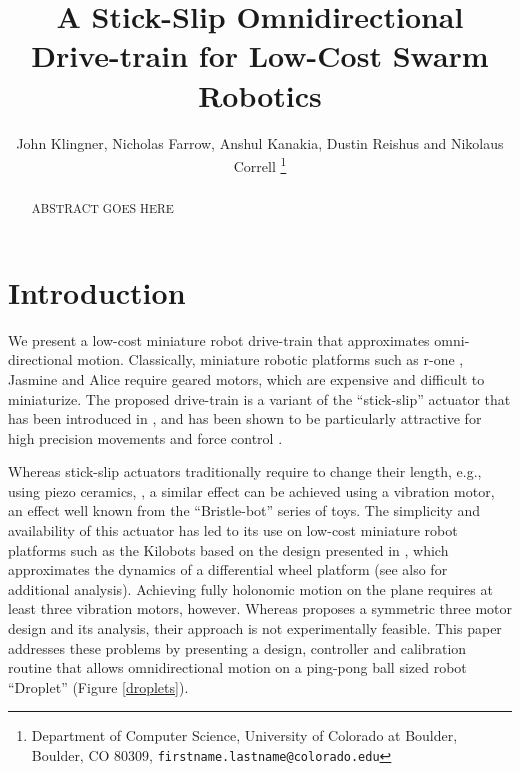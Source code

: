 \documentclass[letterpaper, 10pt, conference]{ieeeconf}
\title{\LARGE \bf
A Stick-Slip Omnidirectional Drive-train for Low-Cost Swarm Robotics
}
\author{John Klingner, Nicholas Farrow, Anshul Kanakia, Dustin Reishus and Nikolaus Correll%
\thanks{Department of Computer Science,
University of Colorado at Boulder,
 Boulder, CO 80309,
{\tt\small firstname.lastname{@}colorado.edu}}%
}
\begin{document}
\maketitle


\begin{abstract}
ABSTRACT GOES HERE
\end{abstract}



\section{Introduction}
We present a low-cost miniature robot drive-train that approximates omni-directional motion. Classically, miniature robotic platforms such as r-one \cite{mclurkin2013low}, Jasmine \cite{jasmine} and Alice \cite{alice} require geared motors, which are expensive and difficult to miniaturize. The proposed drive-train is a variant of the ``stick-slip'' actuator that has been introduced in \cite{breguet1998stick}, and has been shown to be particularly attractive for high precision movements \cite{brufau2005micron,chu2006novel,martel2001three,martel2005fundamental,eigoli2012locomotion} and force control \cite{vartholomeos2008analysis}.   

Whereas stick-slip actuators traditionally require to change their length, e.g., using piezo ceramics,  \cite{breguet1998stick, martel2005fundamental}, a similar effect can be achieved using a vibration motor, an effect well known from the ``Bristle-bot'' series of toys. The simplicity and availability of this actuator  has led to its use on low-cost miniature robot platforms such as the Kilobots \cite{rubenstein2012kilobot} based on the design presented in \cite{Vartholomeos2006}, which approximates the dynamics of a differential wheel platform (see also \cite{spartali2013speed} for additional analysis). Achieving fully holonomic motion on the plane requires at least three vibration motors, however. Whereas \cite{Vartholomeos2005} proposes a symmetric three motor design and its analysis, their approach is not experimentally feasible. This paper addresses these problems by presenting a design, controller and calibration routine that allows omnidirectional motion on a ping-pong ball sized robot ``Droplet'' (Figure \ref{droplets}).
\end{document}
